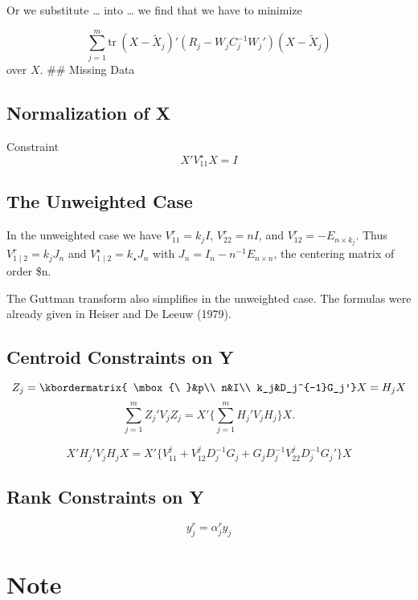 \documentclass[
  12pt,
]{article}
\begin{document}
Or we substitute \ldots{} into \ldots{} we find that we have to minimize

\[
\sum_{j=1}^m\text{tr}\ (X-\tilde X_j)'(R_j-W_jC_j^{-1}W_j')(X-\tilde X_j)
\]
over \(X\).
\#\# Missing Data

\subsection{Normalization of X}\label{normalization-of-x}

Constraint
\[
X'V_{11}^\star X = I
\]

\subsection{The Unweighted Case}\label{the-unweighted-case}

In the unweighted case we have \(V_{11}^r=k_jI\), \(V_{22}^r=nI\), and
\(V_{12}^r=-E_{n\times k_j}\). Thus
\(V_{1\mid2}^r=k_jJ_n\) and \(V_{1\mid 2}^\star=k_\star J_n\)
with \(J_n=I_n-n^{-1}E_{n\times n}\), the centering matrix of order \$n.

The Guttman transform also simplifies in the unweighted case. The formulas were already given in Heiser and De Leeuw (1979).

\subsection{Centroid Constraints on Y}\label{centroid-constraints-on-y}

\[
Z_j=
\kbordermatrix{
\mbox{\ }&p\\
n&I\\
k_j&D_j^{-1}G_j'}X=H_jX
\]
\[
\sum_{j=1}^m Z_j'V_jZ_j=X'\{\sum_{j=1}^mH_j'V_jH_j\}X.
\]

\[
X'H_j'V_jH_jX=X'\{V_{11}^j+V_{12}^jD_j^{-1}G_j+G_jD_j^{-1}V_{22}^jD_j^{-1}G_j'\}X
\]

\subsection{Rank Constraints on Y}\label{rank-constraints-on-y}

\[
y_j^r=\alpha_{j}^ry_j
\]

\section{Note}\label{note}
\end{document}
